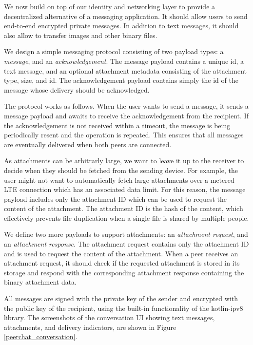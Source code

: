 We now build on top of our identity and networking layer to provide a decentralized alternative of a messaging application. It should allow users to send end-to-end encrypted private messages. In addition to text messages, it should also allow to transfer images and other binary files.

We design a simple messaging protocol consisting of two payload types: a \textit{message}, and an \textit{acknowledgement}. The message payload contains a unique id, a text message, and an optional attachment metadata consisting of the attachment type, size, and id. The acknowledgement payload contains simply the id of the message whose delivery should be acknowledged.

The protocol works as follows. When the user wants to send a message, it sends a message payload and awaits to receive the acknowledgement from the recipient. If the acknowledgement is not received within a timeout, the message is being periodically resent and the operation is repeated. This ensures that all messages are eventually delivered when both peers are connected.

As attachments can be arbitrarly large, we want to leave it up to the receiver to decide when they should be fetched from the sending device. For example, the user might not want to automatically fetch large attachments over a metered LTE connection which has an associated data limit. For this reason, the message payload includes only the attachment ID which can be used to request the content of the attachment. The attachment ID is the hash of the content, which effectively prevents file duplication when a single file is shared by multiple people.

We define two more payloads to support attachments: an \textit{attachment request}, and an \textit{attachment response}. The attachment request contains only the attachment ID and is used to request the content of the attachment. When a peer receives an attachment request, it should check if the requested attachment is stored in its storage and respond with the corresponding attachment response containing the binary attachment data.

All messages are signed with the private key of the sender and encrypted with the public key of the recipient, using the built-in functionality of the kotlin-ipv8 library. The screenshots of the conversation UI showing text messages, attachments, and delivery indicators, are shown in Figure \ref{peerchat_conversation}.

